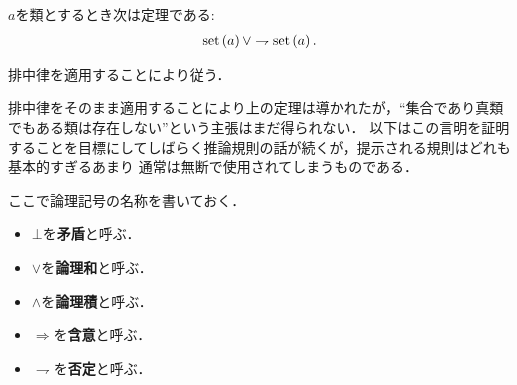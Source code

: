 	
	\begin{screen}
		\begin{thm}[類は集合であるか真類であるかのいずれかに定まる]
			$a$を類とするとき次は定理である:
			\begin{align}
				\operatorname*{set} \left(a\right) \vee \rightharpoondown \operatorname*{set} \left(a\right).
			\end{align}
		\end{thm}
	\end{screen}
	
	\begin{prf}
		排中律を適用することにより従う．
		\QED
	\end{prf}
	
	排中律をそのまま適用することにより上の定理は導かれたが，``集合であり真類でもある類は存在しない''という主張はまだ得られない．
	以下はこの言明を証明することを目標にしてしばらく推論規則の話が続くが，提示される規則はどれも基本的すぎるあまり
	通常は無断で使用されてしまうものである．
	
	ここで論理記号の名称を書いておく．
	\begin{itemize}
		\item $\bot$を{\bf 矛盾}と呼ぶ．
		\item $\vee$を{\bf 論理和}と呼ぶ．
		\item $\wedge$を{\bf 論理積}と呼ぶ．
		\item $\Longrightarrow$を{\bf 含意}と呼ぶ．
		\item $\rightharpoondown$を{\bf 否定}と呼ぶ．
	\end{itemize}
	
